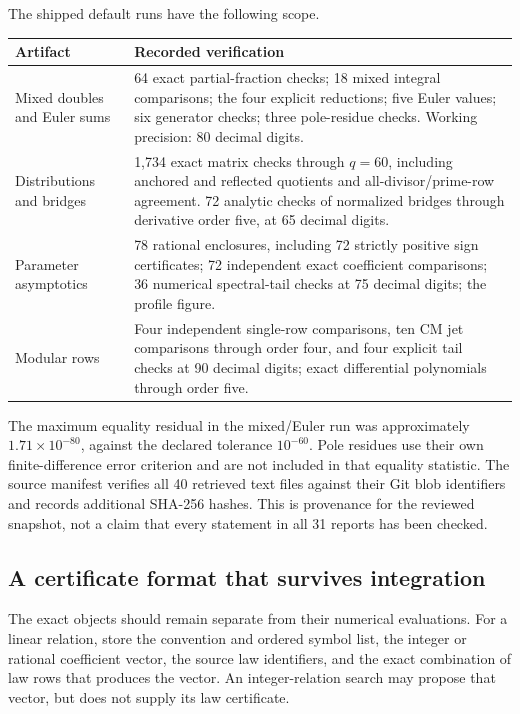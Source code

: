 The shipped default runs have the following scope.
\begin{center}
\small
\begin{tabular}{>{\raggedright\arraybackslash}p{}p{}}
\toprule
Artifact & Recorded verification\\
\midrule
Mixed doubles and Euler sums &
64 exact partial-fraction checks; 18 mixed integral comparisons;
the four explicit reductions; five Euler values; six generator checks;
three pole-residue checks. Working precision: 80 decimal digits.\\
\addlinespace
Distributions and bridges &
1,734 exact matrix checks through \(q=60\), including anchored and
reflected quotients and all-divisor/prime-row agreement.
72 analytic checks of normalized bridges through derivative order five,
at 65 decimal digits.\\
\addlinespace
Parameter asymptotics &
78 rational enclosures, including 72 strictly positive sign certificates;
72 independent exact coefficient comparisons; 36 numerical
spectral-tail checks at 75 decimal digits; the profile figure.\\
\addlinespace
Modular rows &
Four independent single-row comparisons, ten CM jet comparisons through
order four, and four explicit tail checks at 90 decimal digits;
exact differential polynomials through order five.\\
\bottomrule
\end{tabular}
\end{center}

The maximum equality residual in the mixed/Euler run was
approximately \(1.71\times10^{-80}\), against the declared tolerance
\(10^{-60}\). Pole residues use their own finite-difference error
criterion and are not included in that equality statistic.
The source manifest verifies all 40 retrieved text files against their
Git blob identifiers and records additional SHA-256 hashes.
This is provenance for the reviewed snapshot, not a claim that every
statement in all 31 reports has been checked.

\subsection{A certificate format that survives integration}

The exact objects should remain separate from their numerical
evaluations. For a linear relation, store the convention and ordered
symbol list, the integer or rational coefficient vector, the source
law identifiers, and the exact combination of law rows that produces
the vector. An integer-relation search may propose that vector, but
does not supply its law certificate.

